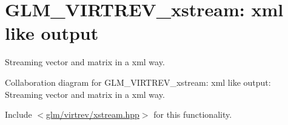 \hypertarget{group__virtrev__xstream}{}\section{G\+L\+M\+\_\+\+V\+I\+R\+T\+R\+E\+V\+\_\+xstream\+: xml like output}
\label{group__virtrev__xstream}


Streaming vector and matrix in a xml way.  


Collaboration diagram for G\+L\+M\+\_\+\+V\+I\+R\+T\+R\+E\+V\+\_\+xstream\+: xml like output\+:
Streaming vector and matrix in a xml way. 

Include $<$\hyperlink{xstream_8hpp}{glm/virtrev/xstream.\+hpp}$>$ for this functionality. 